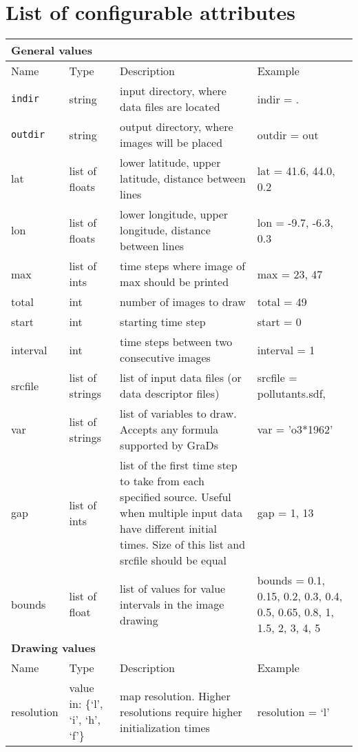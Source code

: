 \documentclass[11pt]{article}
\begin{document}
\appendix
\section{List of configurable attributes}
\label{app:keyval}
\footnotesize
\begin{longtable}{lp{3.5cm}p{5.5cm}p{4cm}}
\hline
\multicolumn{4}{l}{\textbf{General values}}\\
\hline
Name & Type & Description &	Example\\
\hline\hline
\texttt{indir}	& string			& input directory, where data files are located & indir = .\\
\texttt{outdir} & string			& output directory, where images will be placed & outdir = out\\
lat 			& list of floats	& lower latitude, upper latitude, distance between lines & lat = 41.6, 44.0, 0.2\\
lon 			& list of floats	& lower longitude, upper longitude, distance between lines & lon = -9.7, -6.3, 0.3\\
max				& list of ints		& time steps where image of max should be printed & max = 23, 47\\
total			& int				& number of images to draw 					& total = 49\\
start			& int				& starting time step 					& start = 0\\
interval		& int				& time steps between two consecutive images	& interval = 1\\
srcfile			& list of strings	& list of input data files (or data descriptor files) & srcfile = pollutants.sdf,\\
var				& list of strings	& list of variables to draw. Accepts any formula supported by GraDs & var = 'o3*1962'\\
gap				& list of ints		& list of the first time step to take from each specified source. Useful when multiple input data have different initial times. Size of this list and srcfile should be equal & gap = 1, 13\\
bounds			& list of float		& list of values for value intervals in the image drawing & bounds = 0.1, 0.15, 0.2, 0.3, 0.4, 0.5, 0.65, 0.8, 1, 1.5, 2, 3, 4, 5\\
\hline
\multicolumn{4}{l}{\textbf{Drawing values}}\\
\hline
Name & Type & Description &	Example\\
\hline\hline
resolution		& value in: \{`l', `i', `h', `f'\}		& map resolution. Higher resolutions require higher initialization times & resolution = `l'\\

\end{longtable}
\end{document}
